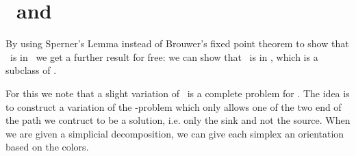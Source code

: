 \section{\Tarski\ and \PPADS}

By using Sperner's Lemma instead of Brouwer's fixed point theorem to show that \Tarskistar\ is in \PPAD\ we get a further result for free: we can show that \Tarski\ is in \PPADS{}, which is a subclass of \PPAD.

For this we note that a slight variation of \Sperner\ is a complete problem for \PPADS. The idea is to construct a variation of the \Sperner-problem which only allows one of the two end of the path we contruct to be a solution, i.e. only the sink and not the source. When we are given a simplicial decomposition, we can give each simplex an orientation based on the colors.

